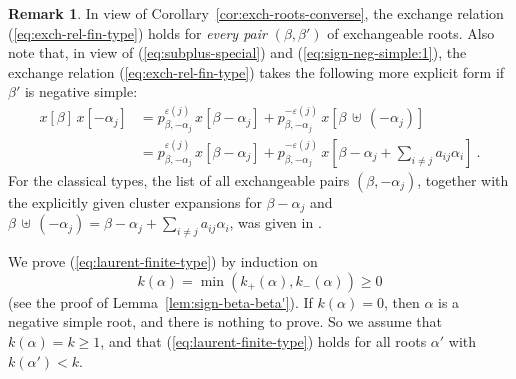 \documentclass[letterpaper]{amsart}
\numberwithin{equation}{section}
\theoremstyle{definition}
\newtheorem{remark}[theorem]{Remark}
\newcommand{\credit}[1]{\smallskip\noindent {\textbf{#1.\ }}}
\def\subplus{{\,\uplus\,} }
\begin{document}
\begin{remark} 
\label{rem:exchange-relations-special} 
In view of Corollary~\ref{cor:exch-roots-converse}, the exchange relation 
(\ref{eq:exch-rel-fin-type}) holds for \emph{every pair} $(\beta,\beta')$ 
of exchangeable roots. 
Also note that, in view of 
(\ref{eq:subplus-special}) and (\ref{eq:sign-neg-simple:1}), 
the exchange relation (\ref{eq:exch-rel-fin-type}) takes the 
following more explicit form if $\beta'$ is negative simple: 
\begin{align} 
\label{eq:special-cluster-expansion} 
x[\beta]\, x[- \alpha_j] 
&= p^{\varepsilon(j)}_{\beta,-\alpha_j} \, x[\beta-\alpha_j] 
+ p^{-\varepsilon(j)}_{\beta,-\alpha_j} \, x[\beta\subplus (-\alpha_j)] 
\\ 
\nonumber 
&= 
p^{\varepsilon(j)}_{\beta,-\alpha_j} \, x[\beta-\alpha_j] 
 + p^{-\varepsilon(j)}_{\beta,-\alpha_j} \, 
 x[\beta-\alpha_j + \textstyle\sum_{i\neq j} a_{ij}\alpha_i] \ . 
\end{align} 
For the classical types, the list of all exchangeable pairs 
$(\beta, - \alpha_j)$, together with the explicitly given cluster 
expansions for $\beta-\alpha_j$ and 
$\beta\subplus (-\alpha_j) = 
\beta-\alpha_j + \textstyle\sum_{i\neq j} a_{ij}\alpha_i$, 
was given in \cite[Section~4]{cfz}. 
\end{remark} 
 
 
\credit{Proof of Theorem~\ref{th:cluster-variable-denominators-1}} 
We prove (\ref{eq:laurent-finite-type}) by induction on 
$$k(\alpha) = \min (k_+ (\alpha), k_- (\alpha)) \geq 0$$ 
(see the proof of Lemma~\ref{lem:sign-beta-beta'}). 
If $k(\alpha) = 0$, then $\alpha$ is a negative simple root, and 
there is nothing to prove. 
So we assume that $k(\alpha) = k \geq 1$, and that (\ref{eq:laurent-finite-type}) 
holds for all roots $\alpha'$ with $k(\alpha') < k$. 
 
\end{document}
